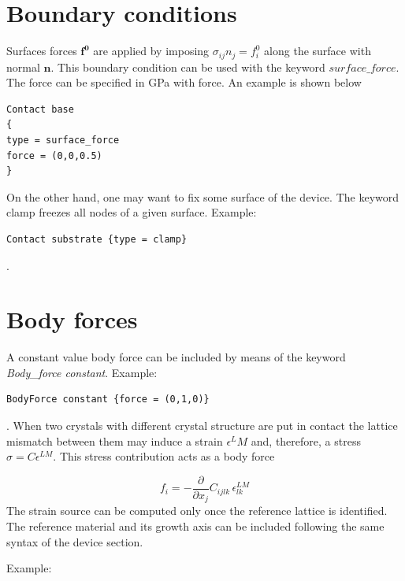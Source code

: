 \documentclass[11pt]{article} %
\begin{document}
 \section{Boundary conditions}
Surfaces forces $\mathbf{f^0}$ are applied by imposing $\sigma_{ij}  n_j= f_i^0$ along the surface with normal $\mathbf{n}$. This boundary condition can be used with the keyword $surface\_force$. The force can be specified in GPa with force. An example is shown below

\begin{verbatim}
Contact base
{
type = surface_force
force = (0,0,0.5) 
}
\end{verbatim}

On the other hand, one may want to fix some surface of the device. The keyword clamp freezes all nodes of a given surface. 
Example:
\begin{verbatim}Contact substrate {type = clamp}\end{verbatim}.

\section{Body forces}

A constant value body force can be included by means of the keyword \emph{Body\_force constant}.
Example: \begin{verbatim}BodyForce constant {force = (0,1,0)}\end{verbatim}.
When two crystals with different crystal structure are put in contact the lattice mismatch between them may induce a strain $\epsilon^LM$ and, therefore, a stress $\sigma =C\epsilon^{LM}$. This stress contribution acts as a body force 

\begin{equation}
 f_i = -\frac{\partial }{\partial x_j} C_{ijlk}\,\epsilon_{lk}^{LM}
\end{equation}
The strain source can be computed only once the reference lattice is identified. The reference material and its growth axis can be included following the same syntax of the device section.

Example:
\end{document}
